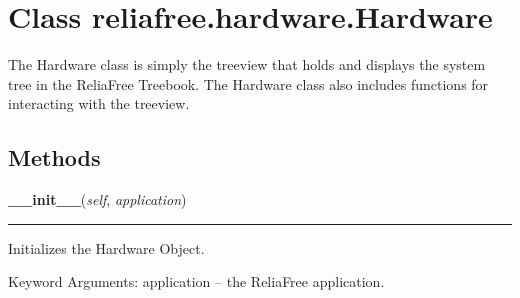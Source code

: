 %
%
%


\section{Class reliafree.hardware.Hardware}

    \label{reliafree:hardware:Hardware}
The Hardware class is simply the treeview that holds and displays the 
system tree in the ReliaFree Treebook.  The Hardware class also includes 
functions for interacting with the treeview.



  \subsection{Methods}

    \label{reliafree:hardware:Hardware:__init__}

    \vspace{0.5ex}

\hspace{.8\funcindent}\begin{boxedminipage}{\funcwidth}

    \raggedright \textbf{\_\_init\_\_}(\textit{self}, \textit{application})

    \vspace{-1.5ex}

    \rule{\textwidth}{0.5\fboxrule}
\setlength{\parskip}{2ex}
    Initializes the Hardware Object.

    Keyword Arguments: application -- the ReliaFree application.

\setlength{\parskip}{1ex}
    \end{boxedminipage}

